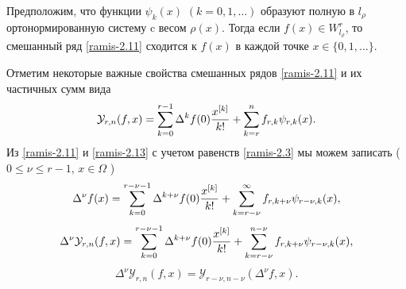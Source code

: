 \begin{theorem}\label{ramis-RItheo2}
Предположим, что    функции $\psi_k(x)$ $(k=0,1,\ldots)$ образуют полную в $l_\rho$ ортонормированную систему  c весом   $\rho(x)$. Тогда если $f(x)\in W^r_{l_\rho}$, то смешанный ряд \eqref{ramis-2.11} сходится к $f(x)$ в каждой точке $x\in \{0,1,\ldots\}$.
\end{theorem}
Отметим некоторые важные свойства смешанных рядов  \eqref{ramis-2.11} и их частичных сумм вида
\begin{equation}\label{ramis-2.13}
 \mathcal{ Y}_{r,n}(f,x)= \sum_{k=0}^{r-1}\Delta^kf(0){x^{[k]}\over k!} +\sum_{k=r}^{n}f_{r,k} \psi_{r,k}(x).
  \end{equation}
Из \eqref{ramis-2.11} и \eqref{ramis-2.13} с учетом равенств \eqref{ramis-2.3} мы можем записать ($0\le\nu\le r-1$, $x\in \Omega$ )
 \begin{equation}\label{ramis-2.130}
 \Delta^\nu f(x)= \sum_{k=0}^{r-\nu-1}\Delta^{k+\nu}f(0){x^{[k]}\over k!} +\sum_{k=r-\nu}^\infty f_{r,k+\nu} \psi_{r-\nu,k}(x),
  \end{equation}
  \begin{equation}\label{ramis-2.14}
 \Delta^\nu\mathcal{ Y}_{r,n}(f,x)= \sum_{k=0}^{r-\nu-1}\Delta^{k+\nu}f(0){x^{[k]}\over k!} +\sum_{k=r-\nu}^{n-\nu} f_{r,k+\nu} \psi_{r-\nu,k}(x),
  \end{equation}
 \begin{equation}\label{ramis-2.15}
 \Delta^\nu\mathcal{ Y}_{r,n}(f,x) = \mathcal{ Y}_{r-\nu,n-\nu}(\Delta^\nu f,x).
  \end{equation}



